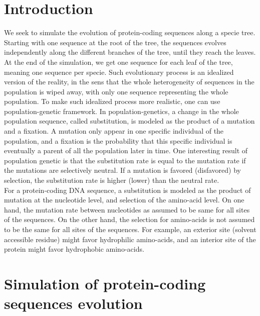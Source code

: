 \section{Introduction}

We seek to simulate the evolution of protein-coding sequences along a specie tree.
Starting with one sequence at the root of the tree, the sequences evolves independently along the different branches of the tree, until they reach the leaves. At the end of the simulation, we get one sequence for each leaf of the tree, meaning one sequence per specie.
Such evolutionary process is an idealized version of the reality, in the sens that the whole heterogeneity of sequences in the population is wiped away, with only one sequence representing the whole population. To make such idealized process more realistic, one can use population-genetic framework. In population-genetics, a change in the whole population sequence, called substitution, is modeled as the product of a mutation and a fixation. A mutation only appear in one specific individual of the population, and a fixation is the probability that this specific individual is eventually a parent of all the population later in time. One interesting result of population genetic is that the substitution rate is equal to the mutation rate if the mutations are selectively neutral. If a mutation is favored (disfavored) by selection, the substitution rate is higher (lower) than the neutral rate.\\

For a protein-coding DNA sequence, a substitution is modeled as the product of mutation at the nucleotide level, and selection of the amino-acid level. On one hand, the mutation rate between nucleotides as assumed to be same for all sites of the sequences. On the other hand, the selection for amino-acids is not assumed to be the same for all sites of the sequences. For example, an exterior site (solvent accessible residue) might favor hydrophilic amino-acids, and an interior site of the protein might favor hydrophobic amino-acids.

\section{Simulation of protein-coding sequences evolution}

